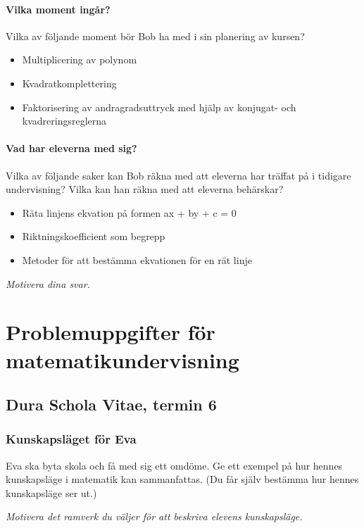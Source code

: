 \subsection{Vilka moment ingår?}
Vilka av följande moment bör Bob ha med i sin planering av kursen?

\begin{itemize}
  \item Multiplicering av polynom
  \item Kvadratkomplettering
  \item Faktorisering av andragradsuttryck med hjälp av konjugat- och kvadreringsreglerna
\end{itemize}

\subsection{Vad har eleverna med sig?}
Vilka av följande saker kan Bob räkna med att eleverna har träffat på i tidigare undervisning? Vilka kan han räkna med att eleverna behärskar?

\begin{itemize}
  \item Räta linjens ekvation på formen ax + by + c = 0
  \item Riktningskoefficient som begrepp
  \item Metoder för att bestämma ekvationen för en rät linje
\end{itemize}

\noindent \emph{Motivera dina svar.}



\newpage
\part*{Problemuppgifter för matematikundervisning}

\chapter{Dura Schola Vitae, termin 6}

\section{Kunskapsläget för Eva}
Eva ska byta skola och få med sig ett omdöme. Ge ett exempel på hur hennes kunskapsläge i matematik kan sammanfattas. (Du får själv bestämma hur hennes kunskapsläge ser ut.)

\emph{Motivera det ramverk du väljer för att beskriva elevens kunskapsläge.}
